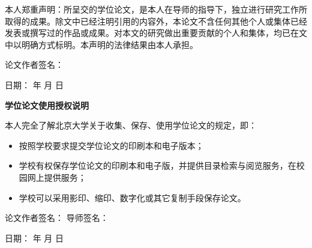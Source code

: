 \documentclass[12pt, a4paper]{ctexart}
\begin{document}
本人郑重声明：所呈交的学位论文，是本人在导师的指导下，独立进行研究工作所取得的成果。除文中已经注明引用的内容外，本论文不含任何其他个人或集体已经发表或撰写过的作品或成果。对本文的研究做出重要贡献的个人和集体，均已在文中以明确方式标明。本声明的法律结果由本人承担。

\vspace{4em} %

\hfill 论文作者签名：\underline{\hspace{3cm}} 

\vspace{2em} %

\hfill 日期：\underline{\hspace{2cm}} 年 \underline{\hspace{1cm}} 月 \underline{\hspace{1cm}} 日

\vspace{2em} %

\begin{center}
    \textbf{学位论文使用授权说明}
\end{center}

\vspace{1em} %

本人完全了解北京大学关于收集、保存、使用学位论文的规定，即：
\begin{itemize}
    \item 按照学校要求提交学位论文的印刷本和电子版本；
    \item 学校有权保存学位论文的印刷本和电子版，并提供目录检索与阅览服务，在校园网上提供服务；
    \item 学校可以采用影印、缩印、数字化或其它复制手段保存论文。
\end{itemize}

\vspace{2em} %

\hfill 论文作者签名：\underline{\hspace{3cm}} \hspace{2em} 导师签名：\underline{\hspace{3cm}}

\vspace{1em} %

\hfill 日期：\underline{\hspace{2cm}} 年 \underline{\hspace{1cm}} 月 \underline{\hspace{1cm}} 日      
\end{document}
